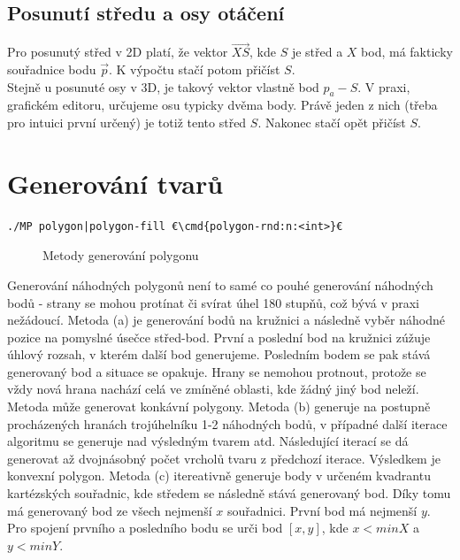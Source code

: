 \documentclass[a4paper,12pt]{report}
\newcommand{\cmd}[1]{\textcolor{blue}{\textbf{#1}}}
\begin{document}
\section{Posunutí středu a osy otáčení}

Pro posunutý střed v 2D platí, že vektor $\vec{XS}$, kde $S$ je střed a $X$ bod, má fakticky souřadnice bodu $\vec{p}$. K výpočtu stačí potom přičíst $S$.\\

Stejně u posunuté osy v 3D, je takový vektor vlastně bod $p_a-S$.
V praxi, grafickém editoru, určujeme osu typicky dvěma body. Právě jeden z nich (třeba pro intuici první určený) je totiž tento střed $S$. Nakonec stačí opět přičíst $S$.









\chapter{Generování tvarů} %

\begin{lstlisting}[emph={:}]
./MP polygon|polygon-fill €\cmd{polygon-rnd:n:<int>}€
\end{lstlisting}

\begin{figure}[H]
  \centering
  \subfigure[Konkávní]{}
  \hfill
  \subfigure[Konvexní]{}
    \hfill
  \subfigure[Konkávní]{}
  \caption{Metody generování polygonu}
  \centering
\end{figure}
 
Generování náhodných polygonů není to samé co pouhé generování náhodných bodů - strany se mohou protínat či svírat úhel 180 stupňů, což bývá v praxi nežádoucí.
Metoda (a) je generování bodů na kružnici a následně vyběr náhodné pozice na pomyslné úsečce střed-bod.
První a poslední bod na kružnici zúžuje úhlový rozsah, v kterém další bod generujeme. Posledním bodem se pak stává generovaný bod a situace se opakuje. Hrany se nemohou protnout, protože se vždy nová hrana nachází celá ve zmíněné oblasti, kde žádný jiný bod neleží. Metoda může generovat konkávní polygony. Metoda (b) generuje na postupně procházených hranách trojúhelníku 1-2 náhodných bodů, v případné další iterace algoritmu se generuje nad výsledným tvarem atd. Následující iterací se dá generovat až dvojnásobný počet vrcholů tvaru z předchozí iterace. Výsledkem je konvexní polygon. Metoda (c) itereativně generuje body v určeném kvadrantu kartézských souřadnic, kde středem se následně stává generovaný bod. Díky tomu má generovaný bod ze všech nejmenší $x$ souřadnici. První bod má nejmenší $y$. Pro spojení prvního a posledního bodu se urči bod $[x,y]$, kde $x<minX$ a $y<minY$.
\end{document}
